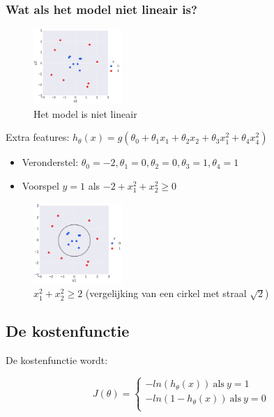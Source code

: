 \documentclass{article}
\begin{document}
\subsubsection{Wat als het model niet lineair is?}

\begin{figure}[H]
    \centering
    \includegraphics[width=0.3\textwidth]{logistic-circle.png}
    \caption{Het model is niet lineair}
\end{figure}


Extra features: $h_{\theta}(x) = g(\theta_0 + \theta_1x_1 + \theta_2x_2 + \theta_3x_1^2 + \theta_4x_4^2)$

\begin{itemize}
    \item Veronderstel: $\theta_0 = -2, \theta_1 = 0, \theta_2 = 0, \theta_3 = 1, \theta_4 = 1$
    \item Voorspel $y=1$ als $-2 + x_1^2 + x_2^2 \geq 0$
\end{itemize}

\begin{figure}[H]
    \centering
    \includegraphics[width=0.3\textwidth]{logistic-circle2.png}
    \caption{$x_1^2 + x_2^2 \geq 2$ (vergelijking van een cirkel met straal $\sqrt{2}$)}
\end{figure}

\subsection{De kostenfunctie}

De kostenfunctie wordt:

\begin{equation}
J(\theta) = \left\{
    \begin{array}{ll}
        -ln(h_\theta(x))\ \text{als}\ y = 1\\
        -ln(1 - h_\theta(x))\ \text{als}\ y = 0\\
    \end{array}
\right.
\end{equation}
\end{document}
